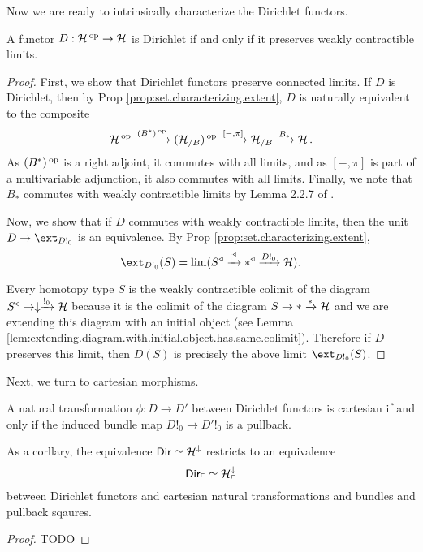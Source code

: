 Now we are ready to intrinsically characterize the Dirichlet functors.
\begin{thm}
A functor $D : \operatorname{\mathcal{H}}\operatorname{^\text{op}} \to \operatorname{\mathcal{H}}$ is Dirichlet if and only if it preserves
weakly contractible limits. 
\end{thm}
\begin{proof}
First, we show that Dirichlet functors preserve connected limits. If $D$ is
Dirichlet, then by Prop \ref{prop:set.characterizing.extent}, $D$ is naturally
equivalent to the composite
$$\operatorname{\mathcal{H}}\operatorname{^\text{op}} \xrightarrow{(B^{\ast})\operatorname{^\text{op}}} (\operatorname{\mathcal{H}}_{/B})\operatorname{^\text{op}} \xrightarrow{[-, \pi]} \operatorname{\mathcal{H}}_{/B}
\xrightarrow{B_\ast} \operatorname{\mathcal{H}}.$$
As $(B^{\ast})\operatorname{^\text{op}}$ is a right adjoint, it commutes with all limits, and as $[-,\pi]$
is part of a multivariable adjunction, it also commutes with all limits.
Finally, we note that $B_{\ast}$ commutes with weakly contractible limits by
Lemma 2.2.7 of \cite{GHK:Analytic.Monads}.

Now, we show that if $D$ commutes with weakly contractible limits, then the unit
$D \to \ext_{D!_0}$ is an equivalence. By Prop
\ref{prop:set.characterizing.extent}, 
  $$\ext_{D!_0}(S) = \lim(S^{\triangleleft} \xto{!^{\triangleleft}} \ast^{\triangleleft}
  \xto{D!_0} \Ha).$$
  
Every homotopy type $S$ is the weakly contractible colimit of the diagram $S^{\triangleleft} \to
\downarrow \xrightarrow{!_0} \operatorname{\mathcal{H}}$ because it is the colimit of the diagram $S \to \ast
\xrightarrow{\ast} \operatorname{\mathcal{H}}$ and we are extending this diagram with an initial object (see
Lemma \ref{lem:extending.diagram.with.initial.object.has.same.colimit}). Therefore if $D$ preserves this limit, then
$D(S)$ is precisely the above limit $\ext_{D!_0}(S)$.
\end{proof}

Next, we turn to cartesian morphisms.
\begin{prop}\label{prop:type.dirichlet.cartesian.iff.bundle.cartesian}
A natural transformation $\phi : D \to D'$ between Dirichlet functors is
cartesian if and only if the induced bundle map $D!_0 \to D'!_0$ is a pullback.

As a corllary, the equivalence $\operatorname{\mathsf{{Dir}}} \simeq \operatorname{\mathcal{H}}^{\downarrow}$ restricts to an
equivalence
$$\operatorname{\mathsf{{Dir}}}_{\ulcorner} \simeq \operatorname{\mathcal{H}}^{\downarrow}_{\ulcorner}$$
between Dirichlet functors and cartesian natural transformations and bundles and
pullback sqaures.
\end{prop}
\begin{proof}
TODO
\end{proof}

